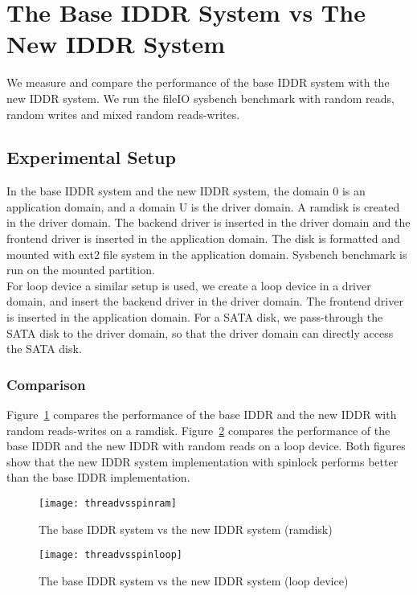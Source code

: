 \section{The Base IDDR System vs The New IDDR System}
We measure and compare the performance of the base IDDR system with the new IDDR system. We run the fileIO sysbench benchmark with random reads, random writes and mixed random reads-writes. 
\subsection*{Experimental Setup}
In the base IDDR system and the new IDDR system, the domain 0 is an application domain, and a domain U is the driver domain. A ramdisk is created in the driver domain. The backend driver is inserted in the driver domain and the frontend driver is inserted in the application domain. The disk is formatted and mounted with ext2 file system in the application domain. Sysbench benchmark is run on the mounted partition. 
\\[3mm]
For loop device a similar setup is used, we create a loop device in a driver domain, and insert the backend driver in the driver domain. The frontend driver is inserted in the application domain. For a SATA disk, we pass-through the SATA disk to the driver domain, so that the driver domain can directly access the SATA disk. 
\subsubsection*{Comparison}
Figure~\ref{fig:threadvsspinram} compares the performance of the base IDDR and the new IDDR with random reads-writes on a ramdisk. Figure~\ref{fig:threadvsspinloop} compares the performance of the base IDDR and the new IDDR with random reads on a loop device. Both figures show that the new IDDR system implementation with spinlock performs better than the base IDDR implementation. 
\begin{figure}[!ht]
\centering
\texttt{[image: threadvsspinram]}
\caption{The base IDDR system vs the new IDDR system (ramdisk)}
\label{fig:threadvsspinram}
\end{figure}
\begin{figure}[!ht]
\centering
\texttt{[image: threadvsspinloop]}
\caption{The base IDDR system vs the new IDDR system (loop device)}
\label{fig:threadvsspinloop}
\end{figure}


